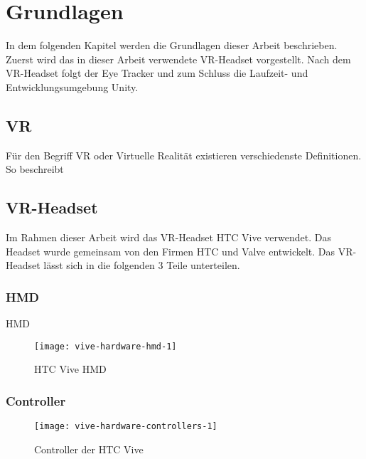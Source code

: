 
\chapter{Grundlagen}
In dem folgenden Kapitel werden die Grundlagen dieser Arbeit beschrieben. Zuerst wird das in dieser Arbeit verwendete \acs{VR}-Headset vorgestellt. Nach dem \acs{VR}-Headset folgt der Eye Tracker und zum Schluss die Laufzeit- und Entwicklungsumgebung Unity.

\section{\acl{VR}}
Für den Begriff \ac{VR} oder Virtuelle Realität existieren verschiedenste Definitionen. So beschreibt 


\section{\acs{VR}-Headset}
Im Rahmen dieser Arbeit wird das \acs{VR}-Headset HTC Vive verwendet. Das Headset wurde gemeinsam von den Firmen HTC und Valve entwickelt. Das \acs{VR}-Headset lässt sich in die folgenden 3 Teile unterteilen. 

\cite{Clay_Koenig_Koenig_2019}
\subsection{\acl{HMD}}
\ac{HMD}

\begin{figure}[!htbp]
	\centering
	\texttt{[image: vive-hardware-hmd-1]}
	\caption[HTC Vive HMD]{HTC Vive \acs{HMD} \cite{ViveHMD}}
	\label{fig:vive-hardware-hmd-1}
\end{figure}


\subsection{Controller}
\begin{figure}[!htbp]
	\centering
	\texttt{[image: vive-hardware-controllers-1]}
	\caption[Controller der HTC Vive]{Controller der HTC Vive \cite{ViveControllers}}
	\label{fig:vive-hardware-controllers-1}
\end{figure}

